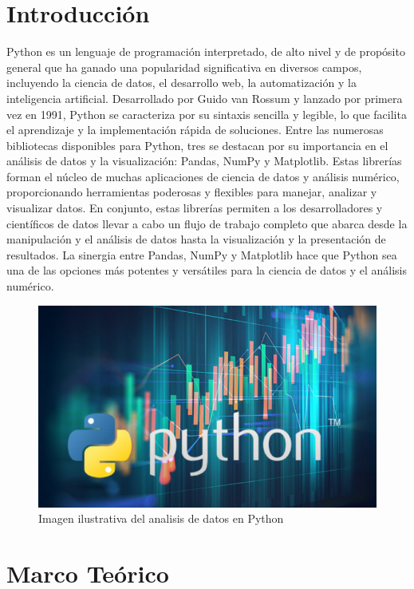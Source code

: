 \documentclass[conference]{IEEEtran}
\begin{document}
\section{Introducci\'on}
    Python es un lenguaje de programación interpretado, de alto nivel y de propósito general que ha ganado una popularidad significativa en diversos campos, incluyendo la ciencia de datos, el desarrollo web, la automatización y la inteligencia artificial. Desarrollado por Guido van Rossum y lanzado por primera vez en 1991, Python se caracteriza por su sintaxis sencilla y legible, lo que facilita el aprendizaje y la implementación rápida de soluciones.
    Entre las numerosas bibliotecas disponibles para Python, tres se destacan por su importancia en el análisis de datos y la visualización: Pandas, NumPy y Matplotlib. Estas librerías forman el núcleo de muchas aplicaciones de ciencia de datos y análisis numérico, proporcionando herramientas poderosas y flexibles para manejar, analizar y visualizar datos.
    En conjunto, estas librerías permiten a los desarrolladores y científicos de datos llevar a cabo un flujo de trabajo completo que abarca desde la manipulación y el análisis de datos hasta la visualización y la presentación de resultados. La sinergia entre Pandas, NumPy y Matplotlib hace que Python sea una de las opciones más potentes y versátiles para la ciencia de datos y el análisis numérico.
    \begin{figure}[h]
    	\centering
    	\includegraphics[scale=1]{python.jpg}
    	\caption{Imagen ilustrativa del analisis de datos en Python} 
    \end{figure}
\section{Marco Te\'orico}
\end{document}
